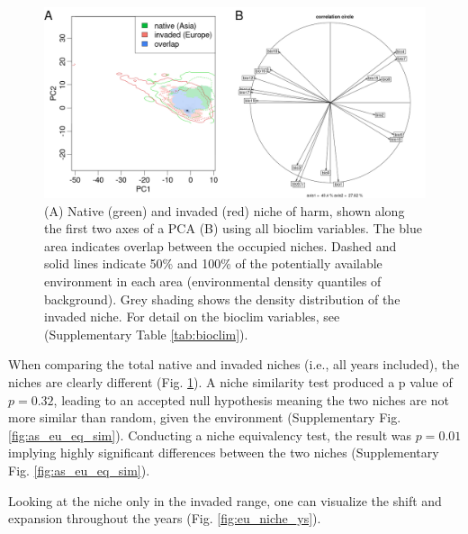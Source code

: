 \documentclass[12pt,a4paper]{article}
\begin{document}
\begin{figure}
    \centering
    \includegraphics[width = 1\linewidth]{"../../R/figures/as-eu-tot-niche-w-pca.png"}
    \caption{\label{fig:as_eu_niche_w_pca} (A) Native (green) and invaded (red) niche of \gls{harm}, shown along the first two axes of a PCA (B) using all bioclim variables. The blue area indicates overlap between the occupied niches. Dashed and solid lines indicate 50\% and 100\% of the potentially available environment in each area (environmental density quantiles of background). Grey shading shows the density distribution of the invaded niche. For detail on the bioclim variables, see (Supplementary Table \ref{tab:bioclim}).}
\end{figure}

When comparing the total native and invaded niches (i.e., all years included), the niches are clearly different (Fig. \ref{fig:as_eu_niche_w_pca}).
A niche similarity test produced a p value of $p = 0.32$, leading to an accepted null hypothesis meaning the two niches are not more similar than random, given the environment (Supplementary Fig. \ref{fig:as_eu_eq_sim}).
Conducting a niche equivalency test, the result was $p = 0.01$ implying highly significant differences between the two niches (Supplementary Fig. \ref{fig:as_eu_eq_sim}).

Looking at the niche only in the invaded range, one can visualize the shift and expansion throughout the years (Fig. \ref{fig:eu_niche_ys}).
\end{document}
